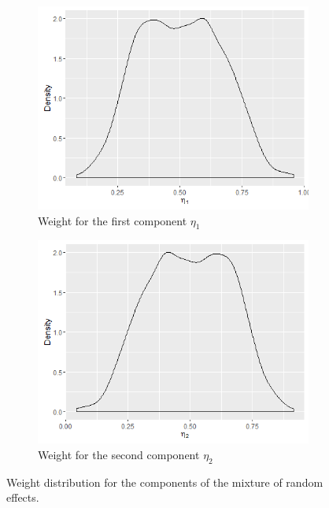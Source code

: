 \begin{figure}[!htb]
\centering
\begin{subfigure}[b]{0.4\textwidth}
		\includegraphics[width=\textwidth]{mainmatter/chapter_6_blood_donor/eta1.png}
        \caption{\label{fig : eta_blood_donor_1} Weight for the first component $\eta_1$}
	\end{subfigure}
	\begin{subfigure}[b]{0.4\textwidth}
		\includegraphics[width=\textwidth]{mainmatter/chapter_6_blood_donor/eta2.png}	
          \caption{\label{fig : eta_blood_donor_2}Weight for the second component $\eta_2$}
	\end{subfigure}	
	\caption{Weight distribution for the components of the mixture of random effects.}
	\label{fig : eta_blood_donor}    
\end{figure} 

